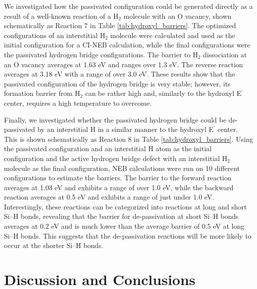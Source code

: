 \documentclass[aps,prb,reprint,superscriptaddress,showpacs]{revtex4-1}
\begin{document}
We investigated how the passivated configuration could be generated directly as a result of a well-known reaction of a H$_2$ molecule with an O vacancy, shown schematically as Reaction 7 in Table \ref{tab:hydroxyl_barriers}. The optimized configurations of an interstitial H$_2$ molecule were calculated and used as the initial configuration for a CI-NEB calculation, while the final configurations were the passivated hydrogen bridge configurations. The barrier to H$_2$ dissociation at an O vacancy averages at 1.63 eV and ranges over 1.3 eV. The reverse reaction averages at 3.18 eV with a range of over 3.0 eV. These results show that the passivated configuration of the hydrogen bridge is very stable; however, its formation barrier from H$_2$ can be rather high and, similarly to the hydroxyl E$^\prime$ center, requires a high temperature to overcome.

Finally, we investigated whether the passivated hydrogen bridge could be de-passivated by an interstitial H in a similar manner to the hydroxyl E$^\prime$ center. This is shown schematically as Reaction 8 in Table \ref{tab:hydroxyl_barriers}. Using the passivated configuration and an interstitial H atom as the initial configuration and the active hydrogen bridge defect with an interstitial H$_2$ molecule as the final configuration, NEB calculations were run on 10 different configurations to estimate the barriers. The barrier to the forward reaction averages at 1.03 eV and exhibits a range of over 1.0 eV, while the backward reaction averages at 0.5 eV and exhibits a range of just under 1.0 eV. Interestingly, these reactions can be categorized into reactions at long and short \mbox{Si--H} bonds, revealing that the barrier for de-passivation at short \mbox{Si--H} bonds averages at 0.2 eV and is much lower than the average barrier of 0.5 eV at long \mbox{Si--H} bonds. This suggests that the de-passivation reactions will be more likely to occur at the shorter \mbox{Si--H} bonds.

\section{Discussion and Conclusions}
\end{document}
